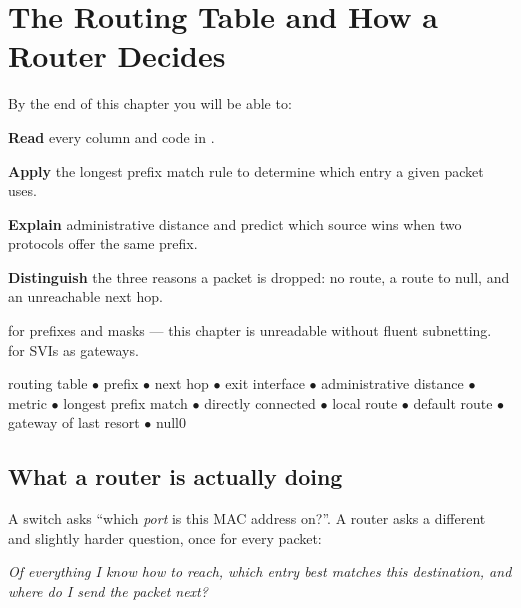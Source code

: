 \chapter{The Routing Table and How a Router Decides}\label{ch:routingtable}

\begin{outcomes}
By the end of this chapter you will be able to:
\begin{tight}
  \item \textbf{Read} every column and code in .
  \item \textbf{Apply} the longest prefix match rule to determine which entry a
        given packet uses.
  \item \textbf{Explain} administrative distance and predict which source wins
        when two protocols offer the same prefix.
  \item \textbf{Distinguish} the three reasons a packet is dropped: no route, a
        route to null, and an unreachable next hop.
\end{tight}
\end{outcomes}

\begin{prereq}
 for prefixes and masks --- this chapter is unreadable without
fluent subnetting.  for SVIs as gateways.
\end{prereq}

\begin{keyterms}
routing table $\bullet$ prefix $\bullet$ next hop $\bullet$ exit interface
$\bullet$ administrative distance $\bullet$ metric $\bullet$ longest prefix match
$\bullet$ directly connected $\bullet$ local route $\bullet$ default route
$\bullet$ gateway of last resort $\bullet$ null0
\end{keyterms}

\section{What a router is actually doing}

A switch asks ``which \emph{port} is this MAC address on?''. A router asks a
different and slightly harder question, once for every packet:

\begin{center}
\emph{Of everything I know how to reach, which entry best matches this
destination, and where do I send the packet next?}
\end{center}

